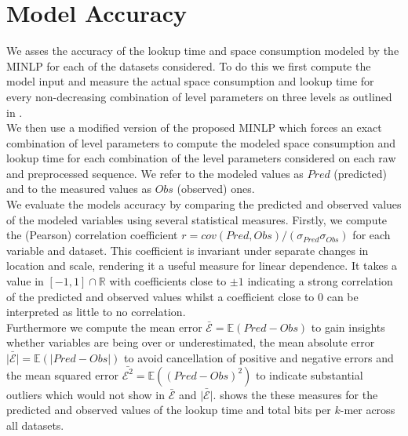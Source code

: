 \documentclass[a4paper,titlepage,onecolumn,oneside,12pt,nenglish,titlepage=firstiscover]{scrbook}
\theoremstyle{plain} %
\theoremstyle{definition} %
\theoremstyle{remark} %
\theoremstyle{plain}
\newcommand{\RR}{\mathbb{R}} %
\begin{document}
\section{Model Accuracy} \label{sec:modelAccuracy}
\newcommand{\NAMEcorrCoef}{r}
\newcommand{\NAMEmeanErrRaw}{\bar{\mathcal{E}}}
\newcommand{\NAMEmeanErrAbs}{\bar{|\mathcal{E}|}}
\newcommand{\NAMEmeanErrSqrd}{\bar{\mathcal{E}^2}}
\newcommand{\corrCoef}{\NAMEcorrCoef = cov(Pred,Obs)/(\sigma_{Pred} \sigma_{Obs})}
\newcommand{\meanErrRaw}{\NAMEmeanErrRaw = \mathbb{E}(Pred-Obs)}
\newcommand{\meanErrAbs}{\NAMEmeanErrAbs = \mathbb{E}(|Pred-Obs|)}
\newcommand{\meanErrSqrd}{\NAMEmeanErrSqrd = \mathbb{E}((Pred-Obs)^2)}
We asses the accuracy of the lookup time and space consumption modeled by the MINLP for each of the datasets considered. To do this we first compute the model input and measure the actual space consumption and lookup time for every non-decreasing combination of level parameters on three levels as outlined in .\\
We then use a modified version of the proposed MINLP which forces an exact combination of level parameters to compute the modeled space consumption and lookup time for each combination of the level parameters considered on each raw and preprocessed sequence. We refer to the modeled values as $Pred$ (predicted) and to the measured values as $Obs$ (observed) ones.\\
We evaluate the models accuracy by comparing the predicted and observed values of the modeled variables using several statistical measures. Firstly, we compute the (Pearson) correlation coefficient $\corrCoef$ for each variable and dataset. This coefficient is invariant under separate changes in location and scale, rendering it a useful measure for linear dependence. It takes a value in $[-1,1] \cap \RR$ with coefficients close to $\pm 1$ indicating a strong correlation of the predicted and observed values whilst a coefficient close to $0$ can be interpreted as little to no correlation.\\
Furthermore we compute the mean error $\meanErrRaw$ to gain insights whether variables are being over or underestimated, the mean absolute error $\meanErrAbs$ to avoid cancellation of positive and negative errors and the mean squared error $\meanErrSqrd$ to indicate substantial outliers which would not show in $\NAMEmeanErrRaw$ and $\NAMEmeanErrAbs$.
 shows the these measures for the predicted and observed values of the lookup time and total bits per $k$-mer across all datasets.\\
\end{document}
